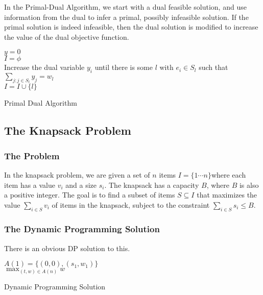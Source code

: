 \documentclass[12pt,letterpaper]{article}
\theoremstyle{definition}
\begin{document}
In the Primal-Dual Algorithm, we start with a dual feasible solution, and use information from the dual to infer a primal, possibly infeasible solution. If the primal solution is indeed infeasible, then the dual solution is modified to increase the value of the dual objective function.


\begin{algorithm}[H]
  \SetAlgoLined
  $y = 0$ \\
  $I = \phi$\\
   {
    Increase the dual variable $y_i$ until there is some $l$ with $e_i \in S_l$ such that $\sum_{j : j \in S_l} y_j = w_l$ \\
    $I = I \cup \{l\}$\\
  }
  \caption{Primal Dual Algorithm}
\end{algorithm}

\subsection{The Knapsack Problem}

\subsubsection{The Problem}

In the knapsack problem, we are given a set of $n$ items $I = \{1 \cdots n\}$where each item has a value $v_i$ and a size $s_i$. The knapsack has a capacity $B$, where $B$ is also a positive integer. The goal is to find a subset of items $S \subseteq I$ that maximizes the value $\sum_{i \in S} v_i$ of items in the knapsack, subject to the constraint $\sum_{i \in S} s_i \leq B$.

\subsubsection{The Dynamic Programming Solution}

There is an obvious DP solution to this.

\begin{algorithm}[H]
  \SetAlgoLined
  $A(1) = \{(0,0), (s_1,w_1)\}$ \\
  \Return $\max_{(t,w) \in A(n)} w$
  \caption{Dynamic Programming Solution}
\end{algorithm}
\end{document}

